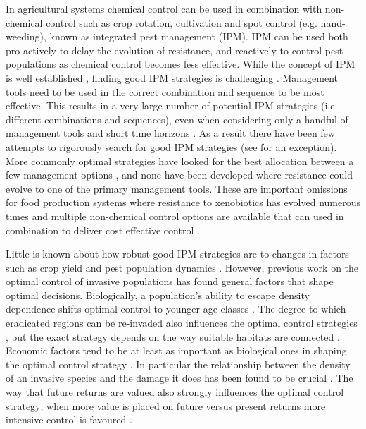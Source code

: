 \documentclass[9pt,twocolumn,twoside,lineno]{pnas-new}
\begin{document}
In agricultural systems chemical control can be used in combination with non-chemical control such as crop rotation, cultivation and spot control (e.g. hand-weeding), known as integrated pest management (IPM). IPM can be used both pro-actively to delay the evolution of resistance, and reactively to control pest populations as chemical control becomes less effective. While the concept of IPM is well established \citep{Bott1979}, finding good IPM strategies is challenging \citep{Dana2014, Chal2015}. Management tools need to be used in the correct combination and sequence to be most effective. This results in a very large number of potential IPM strategies (i.e. different combinations and sequences), even when considering only a handful of management tools and short time horizons \citep{Chal2015}. As a result there have been few attempts to rigorously search for good IPM strategies (see \citealp{Chal2015} for an exception). More commonly optimal strategies have looked for the best allocation between a few management options \citep{EpanN2010, Meis2016, Okum2016, Buyu2017}, and none have been developed where resistance could evolve to one of the primary management tools. These are important omissions for food production systems where resistance to xenobiotics has evolved numerous times \citep{Denh1992, Palu2001} and multiple non-chemical control options are available that can used in combination to deliver cost effective control \citep{Chal2015}.      

Little is known about how robust good IPM strategies are to changes in factors such as crop yield and pest population dynamics \citep{EpanN2010}. However, previous work on the optimal control of invasive populations has found general factors that shape optimal decisions. Biologically, a population's ability to escape density dependence shifts optimal control to younger age classes \citep{Pich2012}. The degree to which eradicated regions can be re-invaded also influences the optimal control strategies \citep{Janu2011, EpaN2012}, but the exact strategy depends on the way suitable habitats are connected \citep{Chads2011}. Economic factors tend to be at least as important as biological ones in shaping the optimal control strategy \citep{EpanN2010}. In particular the relationship between the density of an invasive species and the damage it does has been found to be crucial \citep{Yoko2009}. The way that future returns are valued also strongly influences the optimal control strategy; when more value is placed on future versus present returns more intensive control is favoured \citep{EpanN2010}.
\end{document}
